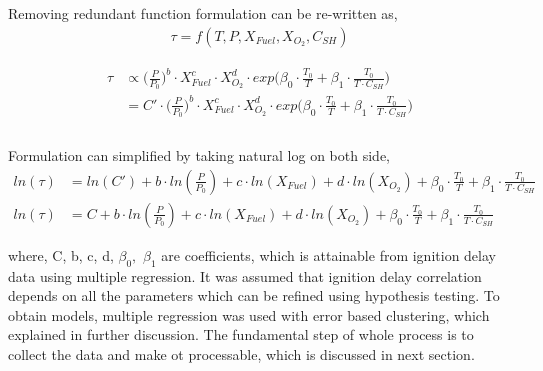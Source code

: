 \documentclass[preprint,12pt]{elsarticle}
\begin{document}
	 	 Removing redundant function formulation can be re-written  as,
	 	\begin{equation}\label{eq:func}
	 	\begin{aligned}
	 	\tau = f(T,P,X_{Fuel},X_{O_2},C_{SH})
	 	\end{aligned} 
	 	\end{equation}
	 	
	 		\begin{equation}
	 		\begin{aligned}
	 		\tau &\propto \bigg(\frac{P}{P_0}\bigg)^b  \cdot X_{Fuel}^c    \cdot X_{O_2}^d    \cdot exp\Bigg( \beta_0 \cdot \frac{T_0}{T} + \beta_1 \cdot \frac{T_0}{T \cdot C_{SH}} \Bigg) \\
	 		&= C' \cdot \bigg(\frac{P}{P_0}\bigg)^b  \cdot X_{Fuel}^c    \cdot X_{O_2}^d    \cdot exp\Bigg( \beta_0 \cdot \frac{T_0}{T} + \beta_1 \cdot \frac{T_0}{T \cdot C_{SH}} \Bigg) \\\\
	 		\end{aligned}
	 		\end{equation}
	 		
	 	Formulation can simplified by taking natural log on both side,
		\begin{equation}\label{eq:hypo_ignition}
			\begin{aligned}
			ln(\tau) &= ln(C') + b \cdot ln(\frac{P}{P_0})+ c \cdot ln(X_{Fuel})+    d \cdot ln(X_{O_2}) + \beta_0 \cdot \frac{T_0}{T} + \beta_1 \cdot \frac{T_0}{T \cdot C_{SH}} \\
			ln(\tau) &= C + b \cdot ln(\frac{P}{P_0})+ c \cdot ln(X_{Fuel})+    d \cdot ln(X_{O_2}) + \beta_0 \cdot \frac{T_0}{T} + \beta_1 \cdot \frac{T_0}{T \cdot C_{SH}}
			\end{aligned}
		\end{equation}
		
		
		
		where, C, b, c, d, $\beta_0,$ $\beta_1$ are coefficients, which is attainable from ignition delay data using multiple regression. It was assumed that ignition delay correlation depends on all the parameters which can be refined using hypothesis testing. To obtain models, multiple regression was used with error based clustering, which explained in further discussion. The fundamental step of whole process is to collect the data and make ot processable, which is discussed in next section.
		
\end{document}
